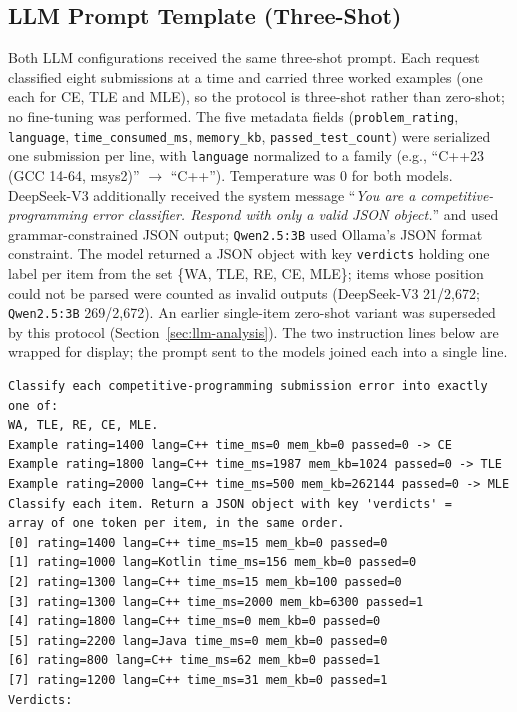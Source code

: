 \documentclass[acmsmall]{acmart}
\begin{document}
\subsection*{LLM Prompt Template (Three-Shot)}
\label{sec:prompt-template}
Both LLM configurations received the same three-shot prompt. Each request
classified eight submissions at a time and carried three worked examples (one
each for CE, TLE and MLE), so the protocol is three-shot rather than
zero-shot; no fine-tuning was performed. The five metadata fields
(\texttt{problem\_rating}, \texttt{language}, \texttt{time\_consumed\_ms},
\texttt{memory\_kb}, \texttt{passed\_test\_count}) were serialized one
submission per line, with \texttt{language} normalized to a family (e.g.,
``C++23 (GCC 14-64, msys2)'' $\rightarrow$ ``C++''). Temperature was 0 for
both models. DeepSeek-V3 additionally received the system message
``\textit{You are a competitive-programming error classifier. Respond with only
a valid JSON object.}'' and used grammar-constrained JSON output;
\texttt{Qwen2.5:3B} used Ollama's JSON format constraint. The model returned a
JSON object with key \texttt{verdicts} holding one label per item from the set
\{WA, TLE, RE, CE, MLE\}; items whose position could not be parsed were counted
as invalid outputs (DeepSeek-V3 21/2{,}672; \texttt{Qwen2.5:3B} 269/2{,}672).
An earlier single-item zero-shot variant was superseded by this protocol
(Section~\ref{sec:llm-analysis}). The two instruction lines below are wrapped
for display; the prompt sent to the models joined each into a single line.

\begin{verbatim}
Classify each competitive-programming submission error into exactly one of:
WA, TLE, RE, CE, MLE.
Example rating=1400 lang=C++ time_ms=0 mem_kb=0 passed=0 -> CE
Example rating=1800 lang=C++ time_ms=1987 mem_kb=1024 passed=0 -> TLE
Example rating=2000 lang=C++ time_ms=500 mem_kb=262144 passed=0 -> MLE
Classify each item. Return a JSON object with key 'verdicts' =
array of one token per item, in the same order.
[0] rating=1400 lang=C++ time_ms=15 mem_kb=0 passed=0
[1] rating=1000 lang=Kotlin time_ms=156 mem_kb=0 passed=0
[2] rating=1300 lang=C++ time_ms=15 mem_kb=100 passed=0
[3] rating=1300 lang=C++ time_ms=2000 mem_kb=6300 passed=1
[4] rating=1800 lang=C++ time_ms=0 mem_kb=0 passed=0
[5] rating=2200 lang=Java time_ms=0 mem_kb=0 passed=0
[6] rating=800 lang=C++ time_ms=62 mem_kb=0 passed=1
[7] rating=1200 lang=C++ time_ms=31 mem_kb=0 passed=1
Verdicts:
\end{verbatim}
\end{document}
